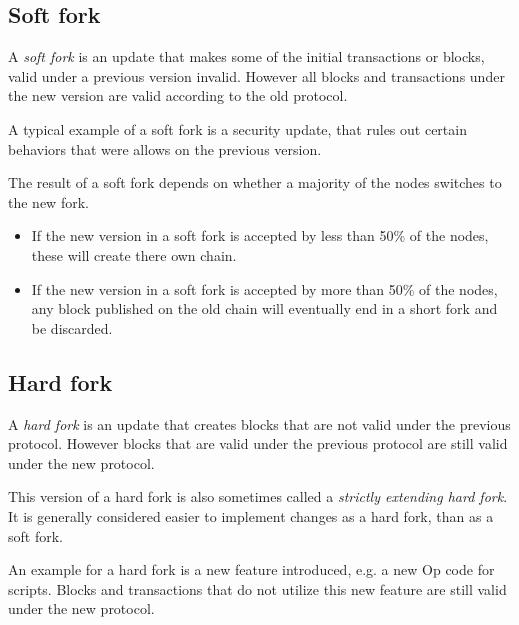 \subsection{Soft fork}
\begin{definition} A \emph{soft fork} is an update that makes some of the initial transactions or blocks, valid under a previous version invalid.
However all blocks and transactions under the new version are valid according to the old protocol.
\end{definition}

\begin{example}
A typical example of a soft fork is a security update, that rules out certain behaviors that were allows on the previous version.
\end{example}

\begin{note}
The result of a soft fork depends on whether a majority of the nodes switches to the new fork.
\begin{itemize}
	\item If the new version in a soft fork is accepted by less than 50\% of the nodes, these will create there own chain.
	\item If the new version in a soft fork is accepted by more than 50\% of the nodes, any block published on the old chain will eventually end in a short fork and be discarded.
\end{itemize}
\end{note}

\subsection{Hard fork}
\begin{definition} A \emph{hard fork} is an update that creates blocks that are not valid under the previous protocol.  
However blocks that are valid under the previous protocol are still valid under the new protocol.
\end{definition}

This version of a hard fork is also sometimes called a \emph{strictly extending hard fork}. It is generally considered easier to implement changes as a hard fork, than as a soft fork. 

\begin{example}
An example for a hard fork is a new feature introduced, e.g. a new Op code for scripts. Blocks and transactions that do not utilize this new feature are still valid under the new protocol.
\end{example}

